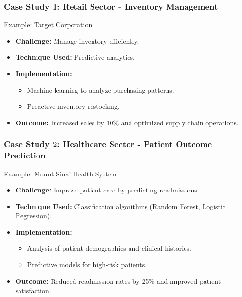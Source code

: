 \documentclass{beamer}
\begin{document}
\begin{frame}[fragile]
    \frametitle{Case Study 1: Retail Sector - Inventory Management}
    \begin{block}{Example: Target Corporation}
        \begin{itemize}
            \item \textbf{Challenge:} Manage inventory efficiently.
            \item \textbf{Technique Used:} Predictive analytics.
            \item \textbf{Implementation:}
                \begin{itemize}
                    \item Machine learning to analyze purchasing patterns.
                    \item Proactive inventory restocking.
                \end{itemize}
            \item \textbf{Outcome:} Increased sales by 10\% and optimized supply chain operations.
        \end{itemize}
    \end{block}
\end{frame}

\begin{frame}[fragile]
    \frametitle{Case Study 2: Healthcare Sector - Patient Outcome Prediction}
    \begin{block}{Example: Mount Sinai Health System}
        \begin{itemize}
            \item \textbf{Challenge:} Improve patient care by predicting readmissions.
            \item \textbf{Technique Used:} Classification algorithms (Random Forest, Logistic Regression).
            \item \textbf{Implementation:}
                \begin{itemize}
                    \item Analysis of patient demographics and clinical histories.
                    \item Predictive models for high-risk patients.
                \end{itemize}
            \item \textbf{Outcome:} Reduced readmission rates by 25\% and improved patient satisfaction.
        \end{itemize}
    \end{block}
\end{frame}
\end{document}
